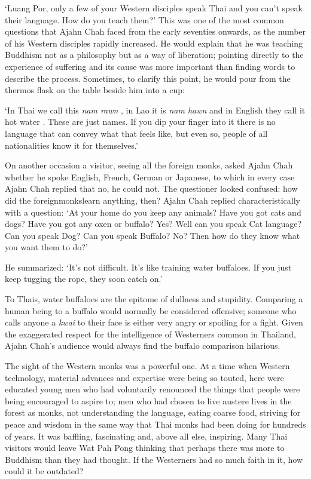 `Luang Por, only a few of your Western disciples speak Thai and you
can't speak their language. How do you teach them?' This was one of the
most common questions that Ajahn Chah faced from the early seventies
onwards, as the number of his Western disciples rapidly increased. He
would explain that he was teaching Buddhism not as a philosophy but as a
way of liberation; pointing directly to the experience of suffering and
its cause was more important than finding words to describe the process.
Sometimes, to clarify this point, he would pour from the thermos flask
on the table beside him into a cup:

`In Thai we call this \emph{nam rawn} , in Lao it is \emph{nam hawn} and
in English they call it hot water . These are just names. If you dip
your finger into it there is no language that can convey what that feels
like, but even so, people of all nationalities know it for themselves.'

On another occasion a visitor, seeing all the foreign monks, asked Ajahn
Chah whether he spoke English, French, German or Japanese, to which in
every case Ajahn Chah replied that no, he could not. The questioner
looked confused: how did the foreignmonkslearn anything, then? Ajahn
Chah replied characteristically with a question: `At your home do you
keep any animals? Have you got cats and dogs? Have you got any oxen or
buffalo? Yes? Well can you speak Cat language? Can you speak Dog? Can
you speak Buffalo? No? Then how do they know what you want them to do?'

He summarized: `It's not difficult. It's like training water buffaloes.
If you just keep tugging the rope, they soon catch on.'

To Thais, water buffaloes are the epitome of dullness and stupidity.
Comparing a human being to a buffalo would normally be considered
offensive; someone who calls anyone a \emph{kwai} to their face is
either very angry or spoiling for a fight. Given the exaggerated respect
for the intelligence of Westerners common in Thailand, Ajahn Chah's
audience would always find the buffalo comparison hilarious.

The sight of the Western monks was a powerful one. At a time when
Western technology, material advances and expertise were being so
touted, here were educated young men who had voluntarily renounced the
things that people were being encouraged to aspire to; men who had
chosen to live austere lives in the forest as monks, not understanding
the language, eating coarse food, striving for peace and wisdom in the
same way that Thai monks had been doing for hundreds of years. It was
baffling, fascinating and, above all else, inspiring. Many Thai visitors
would leave Wat Pah Pong thinking that perhaps there was more to
Buddhism than they had thought. If the Westerners had so much faith in
it, how could it be outdated?

